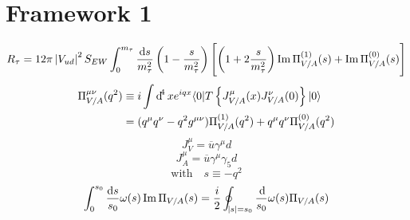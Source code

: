 \documentclass[12pt,a4paper]{scrreprt}
\DeclareMathOperator{\Ima}{Im}
\begin{document}
\section{Framework 1}
\begin{equation*}
  R_\tau = 12 \pi \,\abs{V_{ud}}^2 S_{EW} \int_0^{m_\tau} \frac{\dif s}{m_\tau^2} \left( 1 - \frac{s}{m_\tau^2} \right) \left[ \left( 1 + 2 \frac{s}{m_\tau^2} \right)
    \Ima \Pi_{V/A}^{(1)}(s) + \Ima \Pi_{V/A}^{(0)}(s) \right]
\end{equation*}
\begin{equation*}
  \begin{split}
    \Pi_{V/A}^{\mu\nu}(q^2) &\equiv i \int \dif^4 x e^{iqx} \langle 0\vert T \left\{ J_{V/A}^\mu(x) J_{V/A}^\nu(0)\right\} \vert 0 \rangle \\
    &= (q^\mu q^\nu - q^2 g^{\mu\nu})\Pi_{V/A}^{(1)}(q^2) + q^\mu q^\nu \Pi_{V/A}^{(0)}(q^2)
  \end{split}
\end{equation*}
\begin{equation*}
  J_V^\mu = \overline{u} \gamma^\mu d
\end{equation*}
\begin{equation*}
  J_A^\mu = \overline{u} \gamma^\mu \gamma_5 d
\end{equation*}
\begin{equation*}
  \text{with} \quad s \equiv -q^2
\end{equation*}
\begin{equation*}
  \int_0^{s_0} \frac{\dif s}{s_0} \omega(s) \Ima \Pi_{V/A}(s)
  = \frac{i}{2} \oint_{\abs{s}=s_0} \frac{\dif}{s_0} \omega(s) \Pi_{V/A}(s)
\end{equation*}
\end{document}
